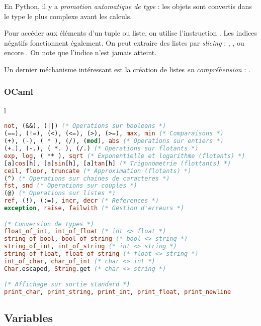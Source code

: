 \documentclass{hibiscus}
\begin{document}
\medskip \par En Python, il y a \textit{promotion automatique de type} : les objets sont convertis dans le type le plus complexe avant les calculs.

\medskip \par Pour accéder aux éléments d'un tuple ou liste, on utilise l'instruction . Les indices négatifs fonctionnent également. On peut extraire des listes par \textit{slicing} : , ,  ou encore . On note que l'indice  n'est jamais atteint.

\medskip \par Un dernier méchanisme intéressant est la création de listes \textit{en compréhension} : .

\subsubsection{OCaml}

\begin{tabular}{l}
\begin{lstlisting}[language=Caml]
not, (&&), (||) (* Operations sur booleens *)
(==), (!=), (<), (<=), (>), (>=), max, min (* Comparaisons *)
(+), (-), ( * ), (/), (mod), abs (* Operations sur entiers *)
(+.), (-.), ( *. ), (/.) (* Operations sur flotants *)
exp, log, ( ** ), sqrt (* Exponentielle et logarithme (flotants) *)
[a]cos[h], [a]sin[h], [a]tan[h] (* Trigonometrie (flottants) *)
ceil, floor, truncate (* Approximation (flotants) *)
(^) (* Operations sur chaines de caracteres *)
fst, snd (* Operations sur couples *)
(@) (* Operations sur listes *)
ref, (!), (:=), incr, decr (* References *)
exception, raise, failwith (* Gestion d'erreurs *) 

(* Conversion de types *)
float_of_int, int_of_float (* int <> float *)
string_of_bool, bool_of_string (* bool <> string *)
string_of_int, int_of_string (* int <> string *)
string_of_float, float_of_string (* float <> string *)
int_of_char, char_of_int (* char <> int *)
Char.escaped, String.get (* char <> string *)

(* Affichage sur sortie standard *)
print_char, print_string, print_int, print_float, print_newline
\end{lstlisting}
\end{tabular}

\subsection{Variables}
\end{document}
